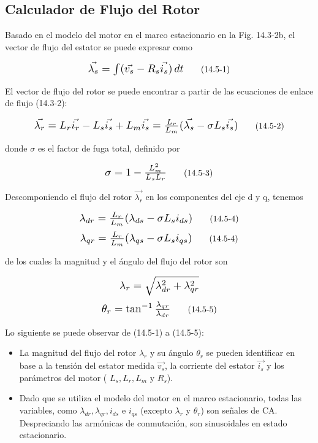 \documentclass[letterpaper,12pt]{article} %
\begin{document}
\subsection{Calculador de Flujo del Rotor}

Basado en el modelo del motor en el marco estacionario en la Fig. 14.3-2b, el vector de flujo del estator se puede expresar como

\[
\scalebox{1.25}{$\vec{\lambda_s} = \int (\vec{v_s} - R_s \vec{i_s}) \, dt$} \tag{14.5-1}
\]

El vector de flujo del rotor se puede encontrar a partir de las ecuaciones de enlace de flujo (14.3-2):

\[
\scalebox{1.25}{$\vec{\lambda_r} = L_r \vec{i_r} - L_s \vec{i_s} + L_m \vec{i_s} = \frac{L_r}{L_m} (\vec{\lambda_s} - \sigma L_s \vec{i_s})$} \tag{14.5-2}
\]

donde \( \sigma \) es el factor de fuga total, definido por

\[
\scalebox{1.25}{$\sigma = 1 - \frac{L_m^2}{L_s L_r}$} \tag{14.5-3}
\]

Descomponiendo el flujo del rotor \( \vec{\lambda_r} \) en los componentes del eje d y q, tenemos

\[
\scalebox{1.25}{$\lambda_{dr} = \frac{L_r}{L_m} (\lambda_{ds} - \sigma L_s i_{ds})$} \tag{14.5-4}
\]
\[
\scalebox{1.25}{$\lambda_{qr} = \frac{L_r}{L_m} (\lambda_{qs} - \sigma L_s i_{qs})$} \tag{14.5-4}
\]

de los cuales la magnitud y el ángulo del flujo del rotor son

\[
\scalebox{1.25}{$\lambda_r = \sqrt{\lambda_{dr}^2 + \lambda_{qr}^2}$}
\]
\[
\scalebox{1.25}{$\theta_r = \tan^{-1} \frac{\lambda_{qr}}{\lambda_{dr}}$} \tag{14.5-5}
\]

Lo siguiente se puede observar de (14.5-1) a (14.5-5):

\begin{itemize}
    \item La magnitud del flujo del rotor \( \lambda_r \) y su ángulo \( \theta_r \) se pueden identificar en base a la tensión del estator medida \( \vec{v_s} \), la corriente del estator \( \vec{i_s} \) y los parámetros del motor ( \( L_s, L_r, L_m \) y \( R_s \)).
    \item Dado que se utiliza el modelo del motor en el marco estacionario, todas las variables, como \( \lambda_{dr}, \lambda_{qr}, i_{ds} \) e \( i_{qs} \) (excepto \( \lambda_r \) y \( \theta_r \)) son señales de CA. Despreciando las armónicas de conmutación, son sinusoidales en estado estacionario.
\end{itemize}
\end{document}
